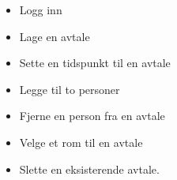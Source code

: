 \begin{itemize}
	\item Logg inn
	\item Lage en avtale
	\item Sette en tidspunkt til en avtale
	\item Legge til to personer
	\item Fjerne en person fra en avtale
	\item Velge et rom til en avtale
	\item Slette en eksisterende avtale.	
\end{itemize}
